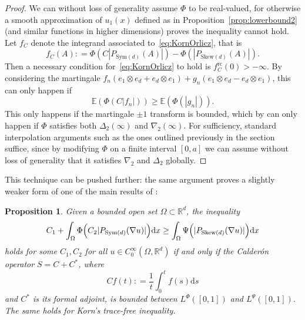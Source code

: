 \documentclass[11pt, a4paper]{amsart}
\newtheorem{proposition}{Proposition}[section]
\theoremstyle{definition}
\theoremstyle{remark}
\newcommand{\R}{\mathbb{R}}
\begin{document}
\begin{proof}
We can without loss of generality assume $\Phi$
to be real-valued, for otherwise a smooth 
approximation of $u_1(x)$ defined as
in Proposition~\ref{prop:lowerbound2}
(and similar functions 
in higher dimensions)
proves the inequality cannot hold.
Let $f_C$ denote the integrand associated
to~\eqref{eq:KornOrlicz},
that is
\[
f_C(A)\mathrel{:}=
\Phi(C |P_{\mathrm{Sym}(d)}(A)|)
-\Phi(|P_{\mathrm{Skew}(d)}(A)|).
\]
Then a necessary condition for~\eqref{eq:KornOrlicz}
to hold is $f_C^{\mathrm{rc}}(0)>-\infty$.
By considering the martingale
$f_n (e_1\otimes e_d+e_d\otimes e_1)
+g_n (e_1\otimes e_d-e_d\otimes e_1)$,
this can only happen if
\begin{equation*}
\mathbb E(\Phi(C |f_n|))\ge \mathbb E(\Phi(|g_n|)).
\end{equation*}
This only happens if the martingale $\pm1$ transform
is bounded,
which by \cite[Theorem 2.c.6]{Lindenstrauss1996}
can only happen
if $\Phi$ satisfies both
$\Delta_2(\infty)$ and $\nabla_2(\infty)$.
For sufficiency,
standard interpolation arguments
such as the ones outlined previously in the section suffice,
since by modifying
$\Phi$ on a finite interval $[0,a]$ we can assume without loss
of generality that
it satisfies $\nabla_2$ and $\Delta_2$ globally.
\end{proof}
This technique can be pushed further: 
the same argument proves a slightly weaker form of one of
the main results of 
\cite{BreitCianchiDiening2017}:
\begin{proposition}\label{prop:KornOrliczcondition}
Given a bounded open set $\Omega\subset \mathbb R^d$,
the inequality
\begin{equation}
\label{eq:KornOrlicz2}
C_1+\int_{\Omega}\Phi\Bigl(
C_2 |P_{\mathrm{Sym}(d)}(\nabla u)|\Bigr)
\mathrm{d}x
\ge \int_{\Omega} \Psi\Bigl(
|P_{\mathrm{Skew}(d)}(\nabla u)|\Bigr)
\mathrm{d}x
\end{equation}
holds for some $C_1,C_2$ for all $u\in C^\infty_0(\Omega, \R^d)$
if and only if the Calderón operator $S=C+C^*$, where 
\begin{equation*}
Cf(t)\mathrel{:}=\frac1t\int_0^t f(s)\mathrm{d}s
\end{equation*}
and $C^*$ is its formal adjoint, is bounded between
$L^{\Phi}([0,1])$
and $L^{\Psi}([0,1])$. The same holds for Korn's
trace-free inequality.
\end{proposition}
\end{document}
